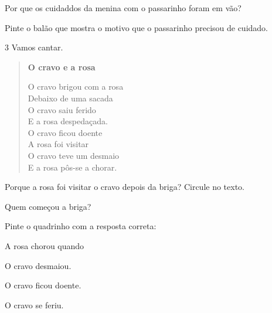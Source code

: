 
\begin{escolha}
\item Por que os cuidaddos da menina com o passarinho foram em vão?


\item Pinte o balão que mostra o motivo que o passarinho precisou de cuidado.
\end{escolha}

\num{3} Vamos cantar.


\begin{verse}
\textbf{O cravo e a rosa}

O cravo brigou com a rosa\\
Debaixo de uma sacada\\
O cravo saiu ferido\\
E a rosa despedaçada.\\
O cravo ficou doente\\
A rosa foi visitar\\
O cravo teve um desmaio\\
E a rosa pôs-se a chorar.
\end{verse}


\begin{escolha}
\item Porque a rosa foi visitar o cravo depois da briga? Circule no texto.

\item Quem começou a briga?


\item Pinte o quadrinho com a resposta correta:

A rosa chorou quando

\begin{boxlist}
\boxitem[] O cravo desmaiou.

\boxitem[] O cravo ficou doente.

\boxitem[] O cravo se feriu.
\end{boxlist}

\end{escolha}

